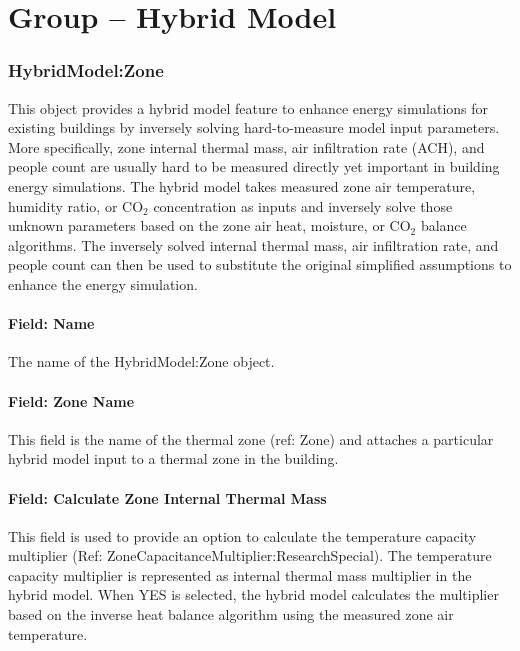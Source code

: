 \section{Group -- Hybrid Model}\label{group-hybrid-model}

\subsubsection{HybridModel:Zone}\label{inputs-hm}

This object provides a hybrid model feature to enhance energy simulations for existing buildings by inversely solving hard-to-measure model input parameters. More specifically, zone internal thermal mass, air infiltration rate (ACH), and people count are usually hard to be measured directly yet important in building energy simulations. The hybrid model takes measured zone air temperature, humidity ratio, or CO$_2$ concentration as inputs and inversely solve those unknown parameters based on the zone air heat, moisture, or CO$_2$ balance algorithms. The inversely solved internal thermal mass, air infiltration rate, and people count can then be used to substitute the original simplified assumptions to enhance the energy simulation.

\paragraph{Field: Name}\label{field-name-hm}

The name of the HybridModel:Zone object.

\paragraph{Field: Zone Name}\label{field-zone-name-hm}

This field is the name of the thermal zone (ref: Zone) and attaches a particular hybrid model input to a thermal zone in the building.

\paragraph{Field: Calculate Zone Internal Thermal Mass}\label{field-calculate-zon-internal-thermal-mass-hm}

This field is used to provide an option to calculate the temperature capacity multiplier (Ref: ZoneCapacitanceMultiplier:ResearchSpecial). The temperature capacity multiplier is represented as internal thermal mass multiplier in the hybrid model.
When YES is selected, the hybrid model calculates the multiplier based on the inverse heat balance algorithm using the measured zone air temperature.

